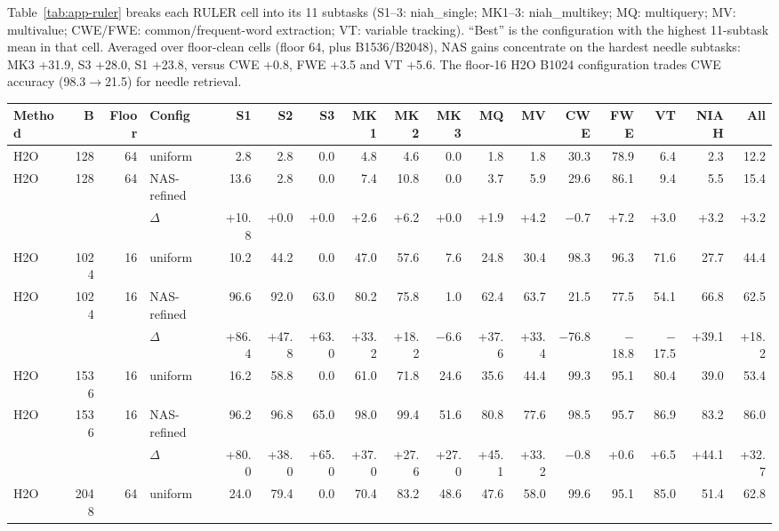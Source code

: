 Table~\ref{tab:app-ruler} breaks each RULER cell into its 11 subtasks (S1--3: niah\_single; MK1--3: niah\_multikey; MQ: multiquery; MV: multivalue; CWE/FWE: common/frequent-word extraction; VT: variable tracking). ``Best'' is the configuration with the highest 11-subtask mean in that cell. Averaged over floor-clean cells (floor 64, plus B1536/B2048), NAS gains concentrate on the hardest needle subtasks: MK3 +31.9, S3 +28.0, S1 +23.8, versus CWE +0.8, FWE +3.5 and VT +5.6. The floor-16 H2O B1024 configuration trades CWE accuracy (98.3$\rightarrow$21.5) for needle retrieval.

\begin{table}[t]
  \centering
  \scriptsize
  \setlength{\tabcolsep}{2.5pt}
  \begin{tabular}{@{}l r r l r r r r r r r r r r r r r @{}}
    \toprule
    Method & B & Floor & Config & S1 & S2 & S3 & MK1 & MK2 & MK3 & MQ & MV & CWE & FWE & VT & NIAH & All \\
    \midrule
    H2O & 128 & 64 & uniform & 2.8 & 2.8 & 0.0 & 4.8 & 4.6 & 0.0 & 1.8 & 1.8 & 30.3 & 78.9 & 6.4 & 2.3 & 12.2 \\
    H2O & 128 & 64 & NAS-refined & 13.6 & 2.8 & 0.0 & 7.4 & 10.8 & 0.0 & 3.7 & 5.9 & 29.6 & 86.1 & 9.4 & 5.5 & 15.4 \\
     &  &  & $\Delta$ & +10.8 & +0.0 & +0.0 & +2.6 & +6.2 & +0.0 & +1.9 & +4.2 & $-$0.7 & +7.2 & +3.0 & +3.2 & +3.2 \\
    \midrule
    H2O & 1024 & 16 & uniform & 10.2 & 44.2 & 0.0 & 47.0 & 57.6 & 7.6 & 24.8 & 30.4 & 98.3 & 96.3 & 71.6 & 27.7 & 44.4 \\
    H2O & 1024 & 16 & NAS-refined & 96.6 & 92.0 & 63.0 & 80.2 & 75.8 & 1.0 & 62.4 & 63.7 & 21.5 & 77.5 & 54.1 & 66.8 & 62.5 \\
     &  &  & $\Delta$ & +86.4 & +47.8 & +63.0 & +33.2 & +18.2 & $-$6.6 & +37.6 & +33.4 & $-$76.8 & $-$18.8 & $-$17.5 & +39.1 & +18.2 \\
    \midrule
    H2O & 1536 & 16 & uniform & 16.2 & 58.8 & 0.0 & 61.0 & 71.8 & 24.6 & 35.6 & 44.4 & 99.3 & 95.1 & 80.4 & 39.0 & 53.4 \\
    H2O & 1536 & 16 & NAS-refined & 96.2 & 96.8 & 65.0 & 98.0 & 99.4 & 51.6 & 80.8 & 77.6 & 98.5 & 95.7 & 86.9 & 83.2 & 86.0 \\
     &  &  & $\Delta$ & +80.0 & +38.0 & +65.0 & +37.0 & +27.6 & +27.0 & +45.1 & +33.2 & $-$0.8 & +0.6 & +6.5 & +44.1 & +32.7 \\
    \midrule
    H2O & 2048 & 64 & uniform & 24.0 & 79.4 & 0.0 & 70.4 & 83.2 & 48.6 & 47.6 & 58.0 & 99.6 & 95.1 & 85.0 & 51.4 & 62.8 \\

\end{tabular}
\end{table}
